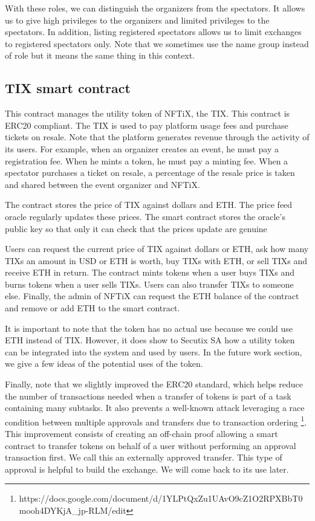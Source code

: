 \documentclass[a4paper,11pt,oneside]{report}
\begin{document}
With these roles, we can distinguish the organizers from the spectators. It allows us to give high privileges to the organizers and limited privileges to the spectators. In addition, listing registered spectators allows us to limit exchanges to registered spectators only. Note that we sometimes use the name group instead of role but it means the same thing in this context. 

\subsection{TIX smart contract}
This contract manages the utility token of NFTiX, the TIX. This contract is ERC20 compliant. The TIX is used to pay platform usage fees and purchase tickets on resale. Note that the platform generates revenue through the activity of its users. For example, when an organizer creates an event, he must pay a registration fee. When he mints a token, he must pay a minting fee. When a spectator purchases a ticket on resale, a percentage of the resale price is taken and shared between the event organizer and NFTiX.

The contract stores the price of TIX against dollars and ETH. The price feed oracle regularly updates these prices. The smart contract stores the oracle's public key so that only it can check that the prices update are genuine

Users can request the current price of TIX against dollars or ETH, ask how many TIXs an amount in USD or ETH is worth, buy TIXs with ETH, or sell TIXs and receive ETH in return. The contract mints tokens when a user buys TIXs and burns tokens when a user sells TIXs. Users can also transfer TIXs to someone else. Finally, the admin of NFTiX can request the ETH balance of the contract and remove or add ETH to the smart contract.

It is important to note that the token has no actual use because we could use ETH instead of TIX. However, it does show to Secutix SA how a utility token can be integrated into the system and used by users. In the future work section, we give a few ideas of the potential uses of the token.

Finally, note that we slightly improved the ERC20 standard, which helps reduce the number of transactions needed when a transfer of tokens is part of a task containing many subtasks. It also prevents a well-known attack leveraging a race condition between multiple approvals and transfers due to transaction ordering \footnote{https://docs.google.com/document/d/1YLPtQxZu1UAvO9cZ1O2RPXBbT0mooh4DYKjA_jp-RLM/edit}. This improvement consists of creating an off-chain proof allowing a smart contract to transfer tokens on behalf of a user without performing an approval transaction first. We call this an externally approved transfer. This type of approval is helpful to build the exchange. We will come back to its use later.
\end{document}
